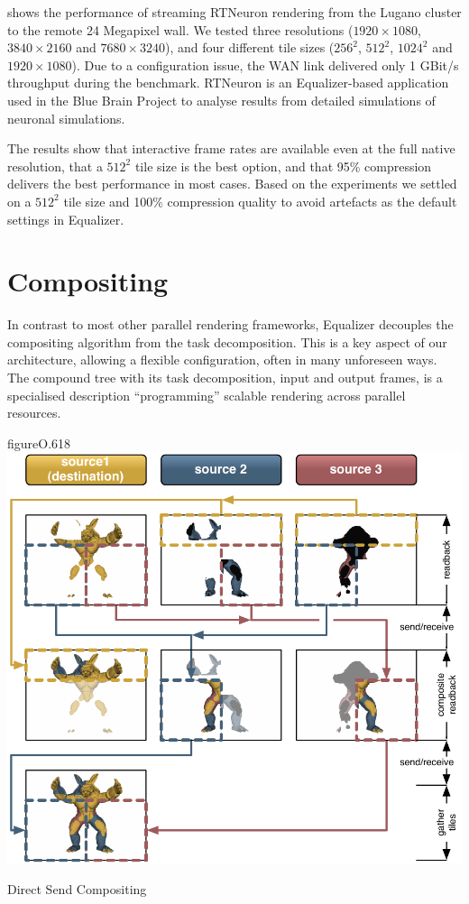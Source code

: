 shows the performance of streaming RTNeuron rendering from the
Lugano cluster to the remote 24 Megapixel wall. We tested three resolutions
($1920\times 1080$, $3840\times 2160$ and $7680\times 3240$), and four
different tile sizes ($256^2$, $512^2$, $1024^2$ and $1920\times 1080$). Due to
a configuration issue, the WAN link delivered only 1 GBit/s throughput during
the benchmark. RTNeuron is an Equalizer-based application used in the Blue
Brain Project to analyse results from detailed simulations of neuronal
simulations.

The results show that interactive frame rates are available even at the full
native resolution, that a $512^2$ tile size is the best option, and that 95\%
compression delivers the best performance in most cases. Based on the
experiments we settled on a $512^2$ tile size and 100\% compression quality to
avoid artefacts as the default settings in Equalizer.

\section{Compositing}

In contrast to most other parallel rendering frameworks, Equalizer decouples the
compositing algorithm from the task decomposition. This is a key aspect of our
architecture, allowing a flexible configuration, often in many unforeseen
ways. The compound tree with its task decomposition, input and output frames, is
a specialised description ``programming'' scalable rendering across parallel
resources.

\begin{wrapfloat}{figure}{O}{.618\textwidth}
  \includegraphics[width=.618\textwidth]{images/directSend}
  {\caption{\label{fDirectSend}Direct Send Compositing}}
\end{wrapfloat}

